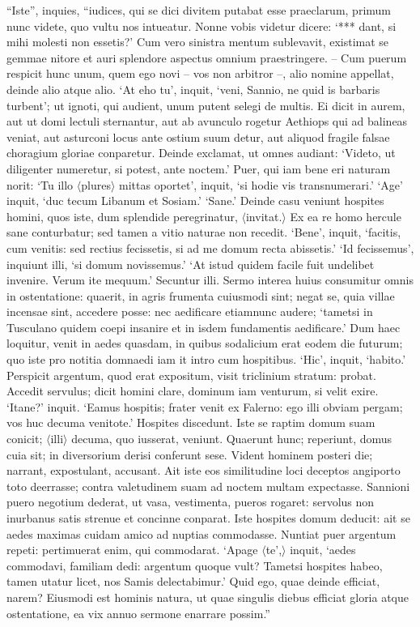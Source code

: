 ``Iste'', inquies, ``iudices, qui se dici divitem putabat esse praeclarum, primum nunc videte, quo vultu nos intueatur. Nonne vobis videtur dicere: `*** dant, si mihi molesti non essetis?' Cum vero sinistra mentum sublevavit, existimat se gemmae nitore et auri splendore aspectus omnium praestringere. – Cum puerum respicit hunc unum, quem ego novi – vos non arbitror –, alio nomine appellat, deinde alio atque alio. `At eho tu', inquit, `veni, Sannio, ne quid is barbaris turbent'; ut ignoti, qui audient, unum putent selegi de multis. Ei dicit in aurem, aut ut domi lectuli sternantur, aut ab avunculo rogetur Aethiops qui ad balineas veniat, aut asturconi locus ante ostium suum detur, aut aliquod fragile falsae choragium gloriae conparetur. Deinde exclamat, ut omnes audiant: `Videto, ut diligenter numeretur, si potest, ante noctem.' Puer, qui iam bene eri naturam norit: `Tu illo $\langle$plures$\rangle$ mittas oportet', inquit, `si hodie vis transnumerari.' `Age' inquit, `duc tecum Libanum et Sosiam.' `Sane.' Deinde casu veniunt hospites homini, quos iste, dum splendide peregrinatur, $\langle$invitat.$\rangle$ Ex ea re homo hercule sane conturbatur; sed tamen a vitio naturae non recedit. `Bene', inquit, `facitis, cum venitis: sed rectius fecissetis, si ad me domum recta abissetis.' `Id fecissemus', inquiunt illi, `si domum novissemus.' `At istud quidem facile fuit undelibet invenire. Verum ite mequum.' Secuntur illi. Sermo interea huius consumitur omnis in ostentatione: quaerit, in agris frumenta cuiusmodi sint; negat se, quia villae incensae sint, accedere posse: nec aedificare etiamnunc audere; `tametsi in Tusculano quidem coepi insanire et in isdem fundamentis aedificare.' Dum haec loquitur, venit in aedes quasdam, in quibus sodalicium erat eodem die futurum; quo iste pro notitia domnaedi iam it intro cum hospitibus. `Hic', inquit, `habito.' Perspicit argentum, quod erat expositum, visit triclinium stratum: probat. Accedit servulus; dicit homini clare, dominum iam venturum, si velit exire. `Itane?' inquit. `Eamus hospitis; frater venit ex Falerno: ego illi obviam pergam; vos huc decuma venitote.' Hospites discedunt. Iste se raptim domum suam conicit; $\langle$illi$\rangle$ decuma, quo iusserat, veniunt. Quaerunt hunc; reperiunt, domus cuia sit; in diversorium derisi conferunt sese. Vident hominem posteri die; narrant, expostulant, accusant. Ait iste eos similitudine loci deceptos angiporto toto deerrasse; contra valetudinem suam ad noctem multam expectasse. Sannioni puero negotium dederat, ut vasa, vestimenta, pueros rogaret: servolus non inurbanus satis strenue et concinne conparat. Iste hospites domum deducit: ait se aedes maximas cuidam amico ad nuptias commodasse. Nuntiat puer argentum repeti: pertimuerat enim, qui commodarat. `Apage $\langle$te',$\rangle$ inquit, `aedes commodavi, familiam dedi: argentum quoque vult? Tametsi hospites habeo, tamen utatur licet, nos Samis delectabimur.' Quid ego, quae deinde efficiat, narem? Eiusmodi est hominis natura, ut quae singulis diebus efficiat gloria atque ostentatione, ea vix annuo sermone enarrare possim.''


